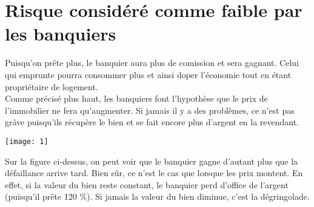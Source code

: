 \section{Risque considéré comme faible par les banquiers}
Puisqu'on prête plus, le banquier aura plus de comission et sera gagnant. Celui qui emprunte pourra consommer plus et ainsi doper l'économie tout en étant propriétaire de logement. \\
Comme précisé plus haut, les banquiers font l'hypothèse que le prix de l'immobilier ne fera qu'augmenter. Si jamais il y a des problèmes, ce n'est pas grâve puisqu'ils récupère le bien et se fait encore plus d'argent en la revendant.\\

\begin{center}
	\texttt{[image: 1]}
\end{center}

Sur la figure ci-dessus, on peut voir que le banquier gagne d'autant plus que la défaillance arrive tard. Bien sûr, ce n'est le cas que lorsque les prix montent. En effet, si la valeur du bien reste constant, le banquier perd d'office de l'argent (puisqu'il prête 120 \%). Si jamais la valeur du bien diminue, c'est la dégringolade.
